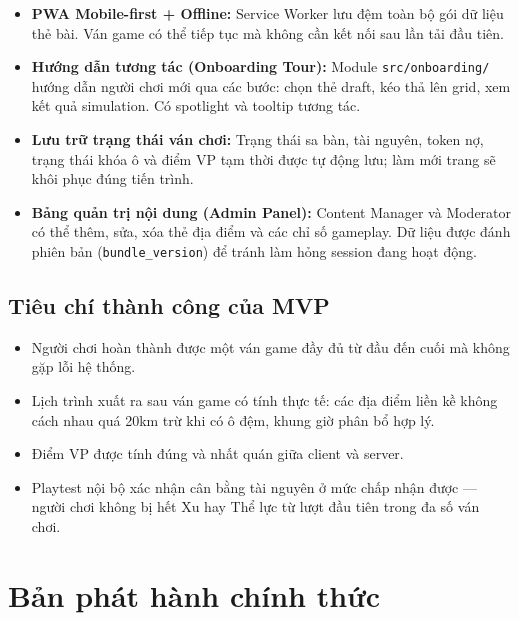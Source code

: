 \begin{itemize}[topsep=0pt, itemsep=2.5pt, leftmargin=1.5cm]
    \item \textbf{PWA Mobile-first + Offline:} Service Worker lưu đệm toàn bộ gói dữ liệu thẻ bài. Ván game có thể tiếp tục mà không cần kết nối sau lần tải đầu tiên.

    \item \textbf{Hướng dẫn tương tác (Onboarding Tour):} Module \texttt{src/onboarding/} hướng dẫn người chơi mới qua các bước: chọn thẻ draft, kéo thả lên grid, xem kết quả simulation. Có spotlight và tooltip tương tác.

    \item \textbf{Lưu trữ trạng thái ván chơi:} Trạng thái sa bàn, tài nguyên, token nợ, trạng thái khóa ô và điểm VP tạm thời được tự động lưu; làm mới trang sẽ khôi phục đúng tiến trình.

    \item \textbf{Bảng quản trị nội dung (Admin Panel):} Content Manager và Moderator có thể thêm, sửa, xóa thẻ địa điểm và các chỉ số gameplay. Dữ liệu được đánh phiên bản (\texttt{bundle\_version}) để tránh làm hỏng session đang hoạt động.
\end{itemize}

\subsection{Tiêu chí thành công của MVP}

\begin{itemize}[topsep=0pt, itemsep=2.5pt, leftmargin=1.5cm]
    \item Người chơi hoàn thành được một ván game đầy đủ từ đầu đến cuối mà không gặp lỗi hệ thống.
    \item Lịch trình xuất ra sau ván game có tính thực tế: các địa điểm liền kề không cách nhau quá 20km trừ khi có ô đệm, khung giờ phân bổ hợp lý.
    \item Điểm VP được tính đúng và nhất quán giữa client và server.
    \item Playtest nội bộ xác nhận cân bằng tài nguyên ở mức chấp nhận được --- người chơi không bị hết Xu hay Thể lực từ lượt đầu tiên trong đa số ván chơi.
\end{itemize}

\section{Bản phát hành chính thức}

